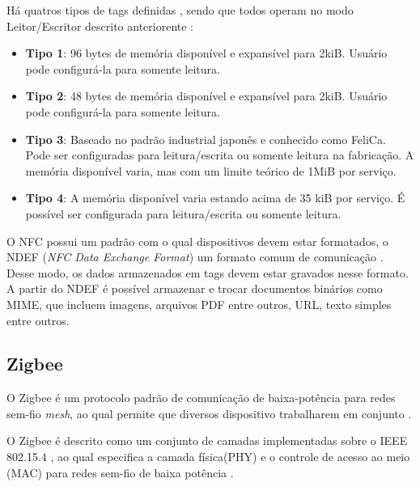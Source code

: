 Há quatros tipos de tags definidas \cite{nfcforumtypespec2017}, sendo que todos operam no modo 
Leitor/Escritor descrito anteriorente : 

\begin{itemize} \parskip -4pt
	\item \textbf{Tipo 1}: 96 bytes de memória disponível e expansível para 2kiB. Usuário pode 
	configurá-la para somente leitura.
	\item \textbf{Tipo 2}: 48 bytes de memória disponível e expansível para 2kiB. Usuário pode 
	configurá-la para somente leitura.
	\item \textbf{Tipo 3}: Baseado no padrão industrial japonês e conhecido como FeliCa. Pode ser 
	configuradas para leitura/escrita ou somente leitura na fabricação. A memória disponível varia, 
	mas com um limite teórico de 1MiB por serviço.
	\item \textbf{Tipo 4}: A memória disponível varia estando acima de 35 kiB por serviço. É 
	possível ser configurada para leitura/escrita ou somente leitura.
\end{itemize}

O NFC possui um padrão com o qual dispositivos devem estar formatados, o NDEF (\textit{NFC Data 
Exchange Format}) um formato comum de comunicação \cite{brianjepsondoncolemantomigoe2014}. Desse 
modo, os dados armazenados em tags devem estar gravados nesse formato. A partir do NDEF é possível 
armazenar e trocar documentos binários como MIME, que incluem imagens, arquivos PDF entre outros, 
URL, texto simples entre outros.







\subsection{Zigbee}

O Zigbee é um protocolo padrão de comunicação de baixa-potência para redes sem-fio \textit{mesh}, 
ao qual permite que diversos dispositivo trabalharem em conjunto \cite{FALUDI2010}.

O Zigbee é descrito como um conjunto de camadas implementadas sobre o IEEE 802.15.4 \cite{FALUDI2010}, ao qual 
especifica a camada física(PHY) e o controle de acesso ao meio (MAC) para 
redes sem-fio de baixa potência \cite{IEEE802154_2011}.


